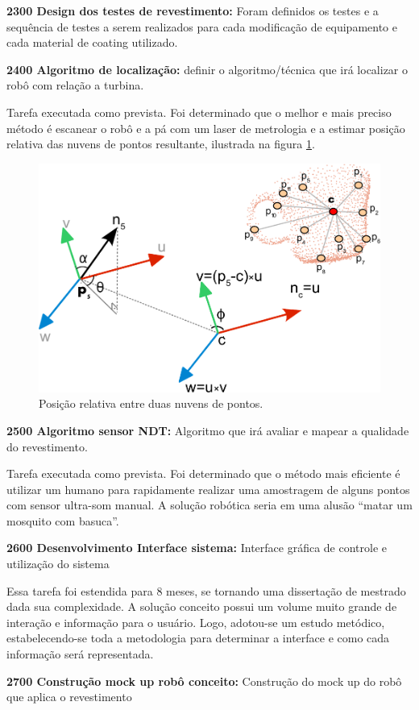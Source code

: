 \noindent
\textbf{2300 Design dos testes de revestimento:} Foram definidos os testes e a
sequência de testes a serem realizados para cada modificação de equipamento e
cada material de coating utilizado.

\noindent
\textbf{2400 Algoritmo de localização:} definir o algoritmo/técnica que irá
localizar o robô com relação a turbina.

Tarefa executada como prevista. Foi determinado que o melhor e mais preciso
método é escanear o robô e a pá com um laser de metrologia e a estimar posição
relativa das nuvens de pontos resultante, ilustrada na figura
\ref{fig::pos_rel}.

\begin{figure}[H]
\centering
\includegraphics[width=0.6\columnwidth]{figs/pc_position}
\caption{Posição relativa entre duas nuvens de pontos.}
\label{fig::pos_rel}
\end{figure} 

\noindent
\textbf{2500 Algoritmo sensor NDT:} Algoritmo que irá avaliar e mapear a
qualidade do revestimento.

Tarefa executada como prevista. Foi determinado que o método mais eficiente é
utilizar um humano para rapidamente realizar uma amostragem de alguns pontos com
sensor ultra-som manual. A solução robótica seria em uma alusão “matar um mosquito com basuca”.

\noindent
\textbf{2600 Desenvolvimento Interface sistema:} Interface gráfica de controle e
utilização do sistema

Essa tarefa foi estendida para 8 meses, se tornando uma dissertação de mestrado
dada sua complexidade. A solução conceito possui um volume muito grande de interação
e informação para o usuário. Logo, adotou-se um estudo metódico,
estabelecendo-se toda a metodologia para determinar a interface e como cada
informação será representada.

\noindent
\textbf{2700 Construção mock up robô conceito:} Construção do mock up do robô
que aplica o revestimento

